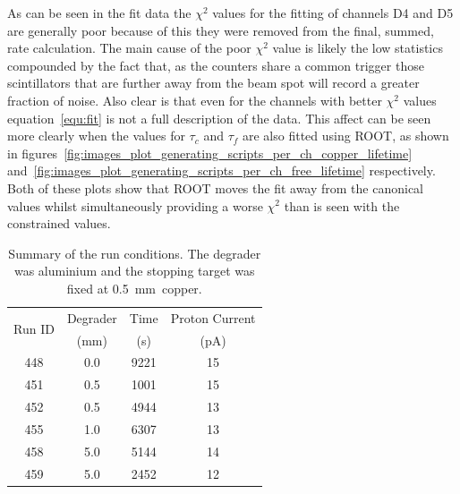 As can be seen in the fit data the \(\chi^2\) values for the fitting of channels D4 and D5 are generally poor because of this they were removed from the final, summed, rate calculation. The main cause of the poor \(\chi^2\) value is likely the low statistics compounded by the fact that, as the counters share a common trigger those scintillators that are further away from the beam spot will record a greater fraction of noise. Also clear is that even for the channels with better \(\chi^2\) values equation~\eqref{equ:fit} is not a full description of the data. This affect can be seen more clearly when the values for \( \tau_c \) and \( \tau_f \) are also fitted using ROOT, as shown in figures~\ref{fig:images_plot_generating_scripts_per_ch_copper_lifetime} and~\ref{fig:images_plot_generating_scripts_per_ch_free_lifetime} respectively. Both of these plots show that ROOT moves the fit away from the canonical values whilst simultaneously providing a worse \(\chi^2\) than is seen with the constrained values.

\begin{table}
  \begin{center}
  \begin{tabular}{c|c|c|c}
    \multirow{2}{*}{Run ID}  &  Degrader  &  Time  &  Proton Current  \\
                             &   (mm)     &   (s)  &   (pA)           \\
    \hline
    448  &  0.0   &   9221  &  15  \\
    451  &  0.5   &   1001  &  15  \\
    452  &  0.5   &   4944  &  13  \\
    455  &  1.0   &   6307  &  13  \\
    458  &  5.0   &   5144  &  14  \\
    459  &  5.0   &   2452  &  12  \\
  \end{tabular}
  \end{center}
  \caption{Summary of the run conditions. The degrader was aluminium and the stopping target was fixed at 0.5~mm~copper.}
  \label{tab:music5_run_summary}
\end{table}

